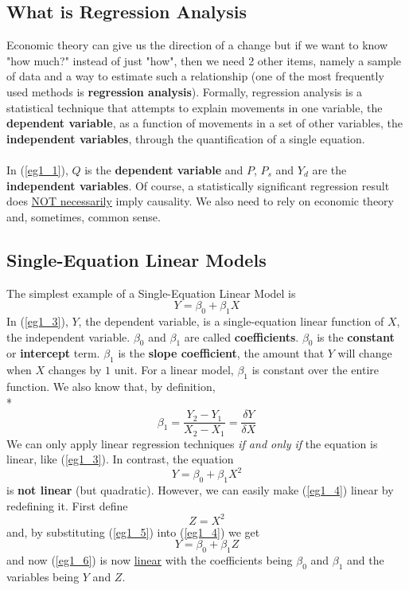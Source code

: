 \documentclass[11pt]{article}
\begin{document}
\subsection{What is Regression Analysis}
Economic theory can give us the direction of a change but if we want to know "how much?" instead of just "how", then we need 2 other items, namely a sample of data and a way to estimate such a relationship (one of the most frequently used methods is \textbf{regression analysis}).
Formally, regression analysis is a statistical technique that attempts to explain movements in one variable, the \textbf{dependent variable}, as a function of movements in a set of other variables, the \textbf{independent variables}, through the quantification of a single equation.\\ \\
In (\ref{eg1_1}), $Q$ is the \textbf{dependent variable} and $P$, $P_s$ and $Y_d$ are the \textbf{independent variables}. Of course, a statistically significant regression result does \underline{NOT necessarily} imply causality. We also need to rely on economic theory and, sometimes, common sense.
\subsection{Single-Equation Linear Models}
The simplest example of a Single-Equation Linear Model is
\begin{equation}
Y=\beta_0 + \beta_1 X \label{eg1_3}
\end{equation}
In (\ref{eg1_3}), $Y$, the dependent variable, is a single-equation linear function of $X$, the independent variable. $\beta_0$ and $\beta_1$ are called \textbf{coefficients}. $\beta_0$ is the \textbf{constant} or \textbf{intercept} term. $\beta_1$ is the \textbf{slope coefficient}, the amount that $Y$ will change when $X$ changes by $1$ unit. For a linear model, $\beta_1$ is constant over the entire function. We also know that, by definition,\\* $$\beta_1 = \frac{Y_2-Y_1}{X_2-X_1} = \frac{\delta Y}{\delta X}$$
We can only apply linear regression techniques \textit{if and only if} the equation is linear, like (\ref{eg1_3}). In contrast, the equation
\begin{equation}
Y=\beta_0 + \beta_1X^2 \label{eg1_4}
\end{equation}
is \textbf{not linear} (but quadratic). However, we can easily make (\ref{eg1_4}) linear by redefining it. First define
\begin{equation}
Z=X^2 \label{eg1_5}
\end{equation}
and, by substituting (\ref{eg1_5}) into (\ref{eg1_4}) we get
\begin{equation}
Y=\beta_0 + \beta_1 Z \label{eg1_6}
\end{equation}
and now (\ref{eg1_6}) is now \underline{linear} with the coefficients being $\beta_0$ and $\beta_1$ and the variables being $Y$ and $Z$.\\
\end{document}
